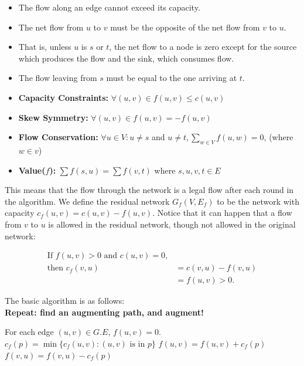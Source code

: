 \documentclass{article}
\begin{document}
{{\begin{itemize}
    \item The flow along an edge cannot exceed its capacity.
    \item The net flow from $u$ to $v$ must be the opposite of the net flow from $v$ to $u$.
    \item That is, unless $u$ is $s$ or $t$, the net flow to a node is zero except for the source which produces the flow and the sink, which consumes flow.
    \item The flow leaving from $s$ must be equal to the one arriving at $t$.
    \item \textbf{Capacity Constraints:} $\forall (u,v) \in f(u,v) \leq c(u,v)$
    \item \textbf{Skew Symmetry:} $\forall (u,v) \in f(u,v) = -f(u,v)$
    \item \textbf{Flow Conservation:} $\forall u \in V : u \neq s$ and $u \neq t, \sum_{w \in V} f(u, w) = 0$, (where $w \in v$)
    \item \textbf{Value($f$):} $\sum f(s,u) = \sum f(v,t)$ where $s,u,v,t \in E$
\end{itemize}
\vspace{0.5cm}
This means that the flow through the network is a legal flow after each round in the algorithm.
\vspace{0.7cm}
We define the residual network $G_f(V,E_f)$ to be the network with capacity $c_f(u,v) = c(u,v) - f(u,v)$. Notice that it can happen that a flow from $v$ to $u$ is allowed in the residual network, though not allowed in the original network:

\begin{align*}
    \text{If } f(u,v) > 0 \text{ and } c(u,v) = 0, \\
    \text{then } c_f(v,u) &= c(v,u) - f(v,u) \\
                           &= f(u,v) > 0.
\end{align*}
\pagebreak

The basic algorithm is as follows:\\

\vspace{0.2cm}
\textbf{Repeat: find an augmenting path, and augment!}
\vspace{0.4cm}

\begin{algorithm}
\caption{Ford-Fulkerson Algorithm}
\begin{algorithmic}[1]
\State For each edge $(u,v) \in G.E$, $f(u,v) = 0$.
    \State $c_f(p) = \min\{c_f(u,v) : (u,v) \text{ is in } p\}$
        \State $f(u,v) = f(u,v) + c_f(p)$ 
        \State $f(v,u) = f(v,u) - c_f(p)$ 
    \EndFor
\EndWhile
\end{algorithmic}
\end{algorithm}

}}
\end{document}

